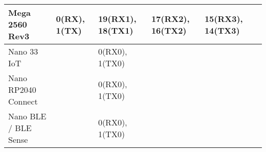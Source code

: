 {\begin{table}[h]
\begin{tabular}{|m{9em}|m{3.5em}|m{3.5em}|m{3.5em}|m{3.5em}|m{3.5em}|}
      \hline
      Mega 2560 Rev3
      & 0(RX), 1(TX) & 19(RX1), 18(TX1) & 17(RX2), 16(TX2) & 15(RX3), 14(TX3) &                  \\
      \hline
      Nano 33 IoT
      &              & 0(RX0), 1(TX0)   &                  &                  &                  \\
      \hline
      Nano RP2040 Connect
      &              & 0(RX0), 1(TX0)   &                  &                  &                  \\
      \hline
      Nano BLE / BLE Sense
      &              & 0(RX0), 1(TX0)   &                  &                  & \\
      \hline
    \end{tabular}
    \caption{\tableCaption}
    \label{table:serial-ports--pins}
  \end{table}
}

